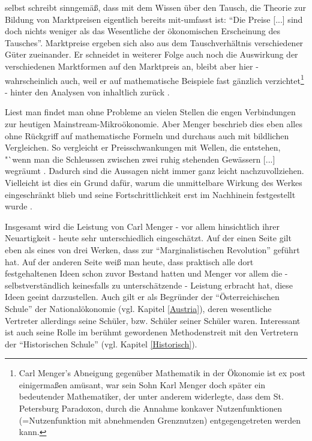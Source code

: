 \textcite[S. 172]{Menger1871} selbst schreibt sinngemäß, dass mit dem Wissen über den Tausch, die Theorie zur Bildung von Marktpreisen eigentlich bereits mit-umfasst ist: "`Die Preise [...] sind doch nichts weniger als das Wesentliche der ökonomischen Erscheinung des Tausches"'. Marktpreise ergeben sich also aus dem Tauschverhältnis verschiedener Güter zueinander. Er schneidet in weiterer Folge auch noch die Auswirkung der verschiedenen Marktformen auf den Marktpreis an, bleibt aber hier - wahrscheinlich auch, weil er auf mathematische Beispiele fast gänzlich verzichtet\footnote{Carl Menger's Abneigung gegenüber Mathematik in der Ökonomie ist ex post einigermaßen amüsant, war sein Sohn Karl Menger doch später ein bedeutender Mathematiker, der unter anderem widerlegte, dass dem St. Petersburg Paradoxon, durch die Annahme konkaver Nutzenfunktionen (=Nutzenfunktion mit abnehmenden Grenznutzen) entgegengetreten werden kann.} - hinter den Analysen von \textcite{Cournot1838} inhaltlich zurück \parencite[S. 304]{Rosner2012}.

Liest man \textcite{Menger1871} findet man ohne Probleme an vielen Stellen die engen Verbindungen zur heutigen Mainstream-Mikroökonomie. Aber Menger beschrieb dies eben alles ohne Rückgriff auf mathematische Formeln und durchaus auch mit bildlichen Vergleichen. So vergleicht er Preisschwankungen mit Wellen, die entstehen, "`wenn man die Schleussen zwischen zwei ruhig stehenden Gewässern [...] wegräumt \parencite[S. 172]{Menger1871}. Dadurch sind die Aussagen nicht immer ganz leicht nachzuvollziehen. Vielleicht ist dies ein Grund dafür, warum die unmittelbare Wirkung des Werkes eingeschränkt blieb und seine Fortschrittlichkeit erst im Nachhinein festgestellt wurde \parencite[S. 304]{Rosner2012}. 

Insgesamt wird die Leistung von Carl Menger - vor allem hinsichtlich ihrer Neuartigkeit - heute sehr unterschiedlich eingeschätzt. Auf der einen Seite gilt \textcite{Menger1871} eben als eines von drei Werken, dass  zur "`Marginalistischen Revolution"' geführt hat. Auf der anderen Seite weiß man heute, dass praktisch alle dort festgehaltenen Ideen schon zuvor Bestand hatten und Menger vor allem die - selbstverständlich keinesfalls zu unterschätzende - Leistung erbracht hat, diese Ideen geeint darzustellen. Auch gilt er als Begründer der "`Österreichischen Schule"' der Nationalökonomie (vgl. Kapitel \ref{Austria}), deren wesentliche Vertreter allerdings seine Schüler, bzw. Schüler seiner Schüler waren. Interessant ist auch seine Rolle im berühmt gewordenen Methodenstreit mit den Vertretern der "`Historischen Schule"' (vgl. Kapitel \ref{Historisch}). 

